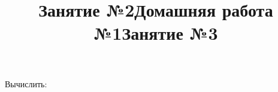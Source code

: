\begin{listofex}
	\item Вычислить:
	\begin{enumcols}[itemcolumns=2]
		\item {}
		\item {}
		\item {}
		\item {}
	\end{enumcols}
	\item {}
\end{listofex}
\newpage
\title{Занятие №2}
\begin{listofex}
	\item {}
	\item {}
	\item {}
	\item {}
	\item {}
	\item {}
	\item {}
	\item {}
\end{listofex}
\newpage
\title{Домашняя работа №1}
\begin{listofex}
	\item {} 
	\item {}
	\item {}
	\item {}
	\item {}
\end{listofex}
\newpage
\title{Занятие №3}
